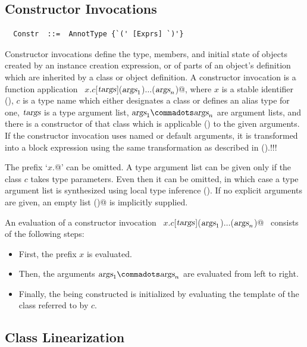 \subsection{Constructor Invocations}
\label{sec:constr-invoke}
\syntax\begin{lstlisting}
  Constr  ::=  AnnotType {`(' [Exprs] `)'}
\end{lstlisting}

Constructor invocations define the type, members, and initial state of
objects created by an instance creation expression, or of parts of an
object's definition which are inherited by a class or object
definition. A constructor invocation is a function application
~\lstinline@$x$.$c$[$\mbox{\sl targs}$]($\mbox{\sl args}_1$)$\ldots$($\mbox{\sl args}_n$)@, where $x$ is a stable identifier
(), $c$ is a type name which either designates a
class or defines an alias type for one, $\mbox{\sl targs}$ is a type argument
list, $\args_1 \commadots \args_n$ are argument lists, and there is a
constructor of that class which is applicable ()
to the given arguments. If the constructor invocation uses named or
default arguments, it is transformed into a block expression using the
same transformation as described in ().!!!

The prefix `\lstinline@$x$.@' can be omitted.  A type argument list
can be given only if the class $c$ takes type parameters.  Even then
it can be omitted, in which case a type argument list is synthesized
using local type inference (). If no explicit
arguments are given, an empty list \lstinline@()@ is implicitly supplied.

An evaluation of a constructor invocation 
~\lstinline@$x$.$c$[$\mbox{\sl targs}$]($\mbox{\sl args}_1$)$\ldots$($\mbox{\sl args}_n$)@~
consists of the following steps:
\begin{itemize}
\item First, the prefix $x$ is evaluated.
\item Then, the arguments $\args_1 \commadots \args_n$ are evaluated from left to right.
\item Finally, the being constructed is initialized by evaluating the
  template of the class referred to by $c$.
\end{itemize}

\subsection{Class Linearization}\label{sec:linearization}

